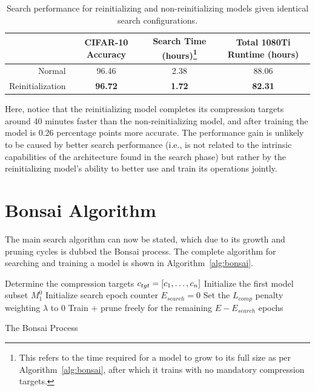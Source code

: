 \begin{table}[h]
\begin{center}
	\begin{minipage}{\linewidth}
	\begin{tabular}{r|c|c|c}
	 & CIFAR-10 Accuracy & Search Time (hours)\footnote{This refers to the time required for a model to grow to its full size as per Algorithm~\ref{alg:bonsai},
	 after which it trains with no mandatory compression targets.} & Total 1080Ti Runtime (hours)\\
	\hline
	Normal				 & 96.46 & 2.38 & 88.06     \\
	Reinitialization 	 & \textbf{96.72} & \textbf{1.72} & \textbf{82.31}	   \\
	\end{tabular}
	\end{minipage}
\end{center}
\caption[Search performance for reinitializing and non-reinitializing models given identical search configurations]{Search performance for reinitializing and non-reinitializing models given identical search configurations.}
\label{tab:search_strategies}
\end{table}

Here, notice that the reinitializing model completes its compression targets around 40 minutes faster than the
non-reinitializing model, and after training the model is 0.26 percentage points more accurate. The performance gain
is unlikely to be caused by better search performance (i.e., is not related to the intrinsic capabilities of the architecture
found in the search phase) but rather by the reinitializing model's ability to better use and train its operations jointly.


\section{Bonsai Algorithm}
The main search algorithm can now be stated, which due to its growth and pruning cycles is dubbed the Bonsai process. The
complete algorithm for searching and training a model is shown in Algorithm~\ref{alg:bonsai}.

\begin{algorithm}[ht]
\SetAlgoLined
{} Determine the compression targets $c_{tgt} = [c_1, \dots, c_{n}]$\;
Initialize the first model subset $M^{0}_{1}$\;
Initialize search epoch counter $E_{search} = 0$\;
\BlankLine
{}
Set the $L_{comp}$ penalty weighting $\lambda$ to 0\;
Train + prune freely for the remaining $E-E_{search}$ epochs\;
\caption{The Bonsai Process}
\label{alg:bonsai}
\end{algorithm}

